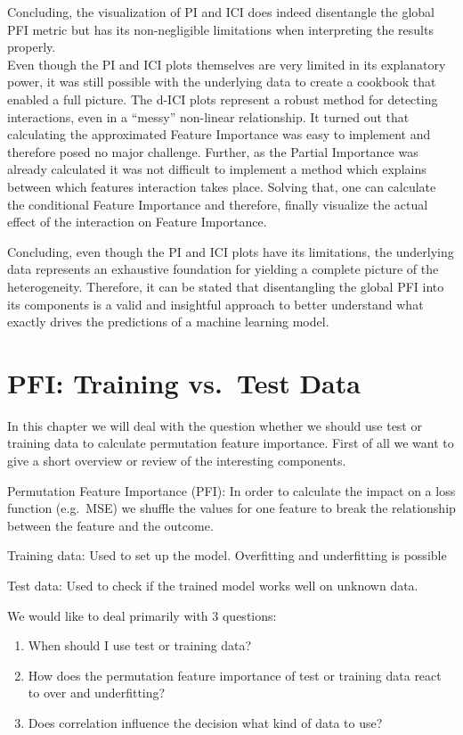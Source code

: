 \documentclass[
]{krantz}
\begin{document}
Concluding, the visualization of PI and ICI does indeed disentangle the global PFI metric but has its non-negligible limitations when interpreting the results properly.\\
Even though the PI and ICI plots themselves are very limited in its explanatory power, it was still possible with the underlying data to create a cookbook that enabled a full picture. The d-ICI plots represent a robust method for detecting interactions, even in a ``messy'' non-linear relationship. It turned out that calculating the approximated Feature Importance was easy to implement and therefore posed no major challenge. Further, as the Partial Importance was already calculated it was not difficult to implement a method which explains between which features interaction takes place. Solving that, one can calculate the conditional Feature Importance and therefore, finally visualize the actual effect of the interaction on Feature Importance.

Concluding, even though the PI and ICI plots have its limitations, the underlying data represents an exhaustive foundation for yielding a complete picture of the heterogeneity. Therefore, it can be stated that disentangling the global PFI into its components is a valid and insightful approach to better understand what exactly drives the predictions of a machine learning model.

\hypertarget{pfi-training-vs.-test-data}{%
\chapter{PFI: Training vs.~Test Data}\label{pfi-training-vs.-test-data}}

In this chapter we will deal with the question whether we should use test or training data to calculate permutation feature importance. First of all we want to give a short overview or review of the interesting components.

Permutation Feature Importance (PFI): In order to calculate the impact on a loss function (e.g.~MSE) we shuffle the values for one feature to break the relationship between the feature and the outcome.

Training data: Used to set up the model. Overfitting and underfitting is possible

Test data: Used to check if the trained model works well on unknown data.

We would like to deal primarily with 3 questions:

\begin{enumerate}
\def\labelenumi{\arabic{enumi}.}
\item
  When should I use test or training data?
\item
  How does the permutation feature importance of test or training data react to over and underfitting?
\item
  Does correlation influence the decision what kind of data to use?
\end{enumerate}
\end{document}
